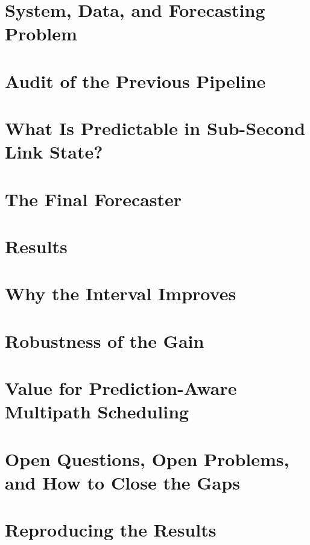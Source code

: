 \documentclass[11pt]{article}
\begin{document}
\section{System, Data, and Forecasting Problem}
\label{sec:system}


\section{Audit of the Previous Pipeline}
\label{sec:audit}


\section{What Is Predictable in Sub-Second Link State?}
\label{sec:predictable}


\section{The Final Forecaster}
\label{sec:methods}


\section{Results}
\label{sec:results}


\section{Why the Interval Improves}
\label{sec:why}


\section{Robustness of the Gain}
\label{sec:robust}


\section{Value for Prediction-Aware Multipath Scheduling}
\label{sec:sched}


\section{Open Questions, Open Problems, and How to Close the Gaps}
\label{sec:open}


\appendix
\section{Reproducing the Results}
\label{app:repro}




\end{document}
